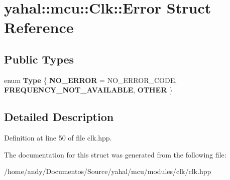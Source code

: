 \hypertarget{structyahal_1_1mcu_1_1_clk_1_1_error}{}\section{yahal\+:\+:mcu\+:\+:Clk\+:\+:Error Struct Reference}
\label{structyahal_1_1mcu_1_1_clk_1_1_error}
\subsection*{Public Types}
\begin{DoxyCompactItemize}
\item 
\hypertarget{structyahal_1_1mcu_1_1_clk_1_1_error_a2adeac4ff415df9b1cfe8707f88ae2ab}{}enum {\bfseries Type} \{ {\bfseries N\+O\+\_\+\+E\+R\+R\+O\+R} = N\+O\+\_\+\+E\+R\+R\+O\+R\+\_\+\+C\+O\+D\+E, 
{\bfseries F\+R\+E\+Q\+U\+E\+N\+C\+Y\+\_\+\+N\+O\+T\+\_\+\+A\+V\+A\+I\+L\+A\+B\+L\+E}, 
{\bfseries O\+T\+H\+E\+R}
 \}\label{structyahal_1_1mcu_1_1_clk_1_1_error_a2adeac4ff415df9b1cfe8707f88ae2ab}

\end{DoxyCompactItemize}


\subsection{Detailed Description}


Definition at line 50 of file clk.\+hpp.



The documentation for this struct was generated from the following file\+:\begin{DoxyCompactItemize}
\item 
/home/andy/\+Documentos/\+Source/yahal/mcu/modules/clk/clk.\+hpp\end{DoxyCompactItemize}
